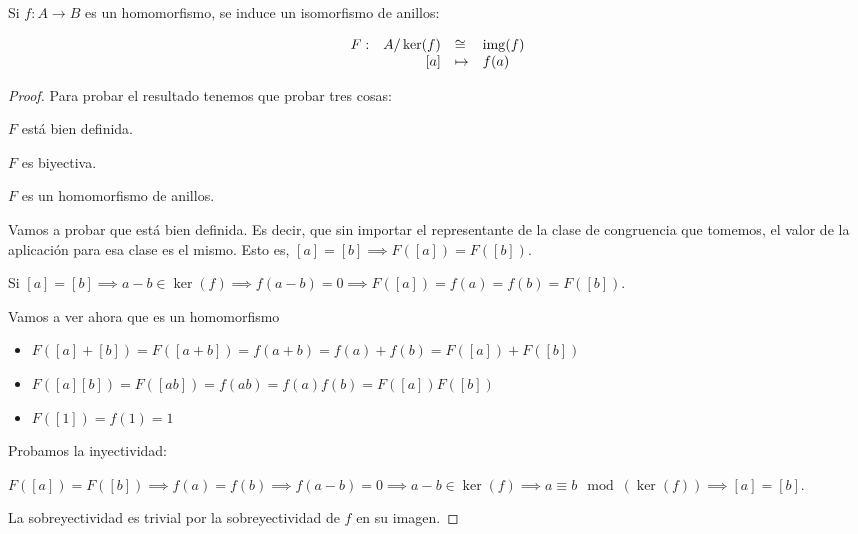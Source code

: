 \begin{nth}
  Si $f:A \to B$ es un homomorfismo, se induce un isomorfismo de anillos:

  \[
  \begin{array}{lrll}
    F: &  A/\ker(f) & \cong & \operatorname*{img}(f) \\
       & [a] & \mapsto & f(a)
  \end{array}
  \]


\begin{proof}
  Para probar el resultado tenemos que probar tres cosas:

  \begin{nlist}
  \item $F$ está bien definida.
  \item $F$ es biyectiva.
  \item $F$ es un homomorfismo de anillos.
  \end{nlist}

  Vamos a probar que está bien definida. Es decir, que sin importar el representante de la clase de congruencia que tomemos,
  el valor de la aplicación para esa clase es el mismo. Esto es, $[a] = [b] \implies F([a]) = F([b])$.

  Si $[a] = [b] \implies a-b \in \ker(f) \implies f(a-b) = 0 \implies F([a]) = f(a) = f(b) = F([b])$.

  Vamos a ver ahora que es un homomorfismo
  \begin{itemize}
		\item $F([a]+[b]) = F([a+b]) = f(a+b) = f(a)+f(b) = F([a]) + F([b])$
		\item $F([a][b]) = F([ab]) = f(ab) = f(a)f(b) = F([a])F([b])$
		\item $F([1]) = f(1) = 1$
  \end{itemize}

Probamos la inyectividad:

$F([a]) = F([b]) \implies f(a) = f(b) \implies f(a-b) = 0 \implies a-b \in \ker(f) \implies a \equiv b\mod(\ker(f)) \implies [a] = [b]$.

La sobreyectividad es trivial por la sobreyectividad de $f$ en su imagen.

\end{proof}

\end{nth}

